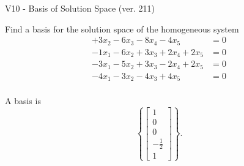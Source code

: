 \begin{exercise}
  \begin{exerciseTitle}V10 - Basis of Solution Space (ver. 211)\end{exerciseTitle}
  \begin{exerciseStatement}
    Find a basis for the solution space of the homogeneous system 
\begin{align*}
 + 3 x_ 2 -6 x_ 3 -8 x_ 4 -4 x_ 5 &= 0  \\ 
  -1 x_ 1 -6 x_ 2 + 3 x_ 3 + 2 x_ 4 + 2 x_ 5 &= 0  \\ 
  -3 x_ 1 -5 x_ 2 + 3 x_ 3 -2 x_ 4 + 2 x_ 5 &= 0  \\ 
  -4 x_ 1 -3 x_ 2 -4 x_ 3 + 4 x_ 5 &= 0  \\ 
 \end{align*}


 
  \end{exerciseStatement}

  \begin{exerciseAnswer}
   A basis is   
\[\left\{\left[\begin{array}{c}
1 \\
0 \\
0 \\
-\frac{1}{2} \\
1
\end{array}\right]\right\}.\]

  


  \end{exerciseAnswer}
\end{exercise}